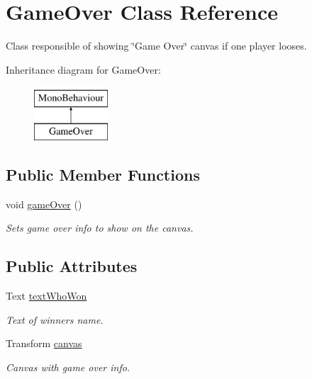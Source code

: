 \hypertarget{class_game_over}{}\section{Game\+Over Class Reference}
\label{class_game_over}


Class responsible of showing \char`\"{}\+Game Over\char`\"{} canvas if one player looses.  


Inheritance diagram for Game\+Over\+:\begin{figure}[H]
\begin{center}
\leavevmode
\includegraphics[height=2.000000cm]{class_game_over}
\end{center}
\end{figure}
\subsection*{Public Member Functions}
\begin{DoxyCompactItemize}
\item 
void \mbox{\hyperlink{class_game_over_a03d824dff5b997d7566f5e7bb5326609}{game\+Over}} ()
\begin{DoxyCompactList}\small\item\em Sets game over info to show on the canvas. \end{DoxyCompactList}\end{DoxyCompactItemize}
\subsection*{Public Attributes}
\begin{DoxyCompactItemize}
\item 
Text \mbox{\hyperlink{class_game_over_a05fc5c0c7a78b9a32de2bd9a9bfcac57}{text\+Who\+Won}}
\begin{DoxyCompactList}\small\item\em Text of winner\textquotesingle{}s name. \end{DoxyCompactList}\item 
Transform \mbox{\hyperlink{class_game_over_ad71e27e7f62da1f7abba74e31d89e9d5}{canvas}}
\begin{DoxyCompactList}\small\item\em Canvas with game over info. \end{DoxyCompactList}\end{DoxyCompactItemize}
